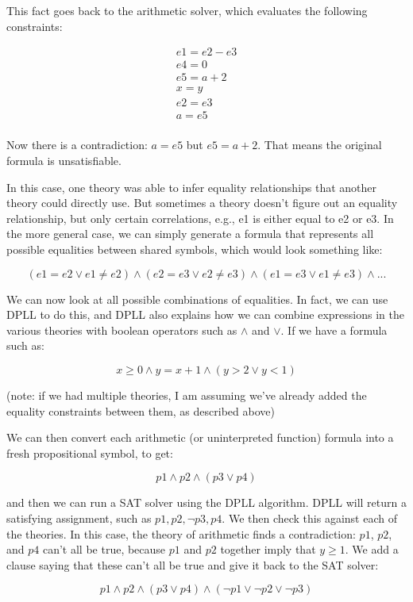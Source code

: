 \documentclass[11pt]{article}
\begin{document}
This fact goes back to the arithmetic solver, which evaluates the following
constraints:

\[
\begin{array}{l}
e1 = e2 - e3 \\
e4 = 0 \\
e5 = a + 2 \\
x = y \\
e2 = e3 \\
a = e5 \\
\end{array}
\]

Now there is a contradiction: $a = e5$ but $e5 = a + 2$. That means the original
formula is unsatisfiable.

In this case, one theory was able to infer equality relationships that another
theory could directly use. But sometimes a theory doesn't figure out an equality
relationship, but only certain correlations, e.g., e1 is either equal to e2 or
e3. In the more general case, we can simply generate a formula that represents
all possible equalities between shared symbols, which would look something like:

\[
(e1 = e2 \lor e1 \neq e2) \land (e2 = e3 \lor e2 \neq e3) \land (e1 = e3 \lor e1 \neq e3) \land ...
\]

We can now look at all possible combinations of equalities. In fact, we can use
DPLL to do this, and DPLL also explains how we can combine expressions in the
various theories with boolean operators such as $\land$ and $\lor$. If we have a
formula such as:

\[
x \geq 0 \land y = x + 1 \land (y > 2 \lor y < 1)
\]

(note: if we had multiple theories, I am assuming we've already added the
equality constraints between them, as described above)

We can then convert each arithmetic (or uninterpreted function) formula into a
fresh propositional symbol, to get:

\[
p1 \land p2 \land (p3 \lor p4)
\]

and then we can run a SAT solver using the DPLL algorithm. DPLL will return a
satisfying assignment, such as $p1, p2, \lnot p3, p4$. We then check this
against each of the theories. In this case, the theory of arithmetic finds a
contradiction: $p1$, $p2$, and $p4$ can't all be true, because $p1$ and $p2$
together imply that $y \ge 1$. We add a clause saying that these can't all be
true and give it back to the SAT solver:

\[
p1 \land p2 \land (p3 \lor p4) \land (\lnot p1 \lor \lnot p2 \lor \lnot p3)
\]
\end{document}
